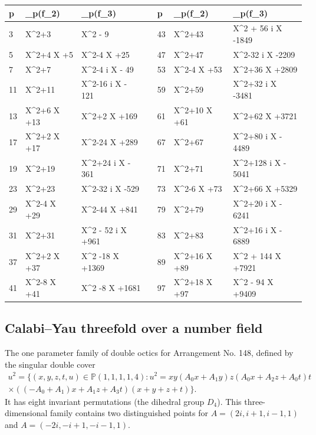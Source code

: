 \documentclass[12pt]{amsart}
\theoremstyle{plain}
\theoremstyle{remark}
\theoremstyle{definition}
\newcommand{\PP}{\mathbb P}
\numberwithin{table}{section}
\begin{document}
\begin{longtable}{L|L|Lp{1.5cm}L|L|L}

	p&\chi_{p}(f_{2})&\chi_{p}(f_{3})&&		p&\chi_{p}(f_{2})&\chi_{p}(f_{3})\\
	& X^{2}+3 & X^{2} - 9 &&
	43& X^{2}+43 & X^{2} + 56 i X -1849 \\
	5& X^{2}+4 X +5 & X^{2}-4 X +25 &&	47& X^{2}+47 & X^{2}-32 i X -2209 \\
	7& X^{2}+7 & X^{2}-4 i X - 49 &&53& X^{2}-4 X +53 & X^{2}+36 X +2809 \\
	11& X^{2}+11 & X^{2}-16 i X - 121 &&59& X^{2}+59 & X^{2}+32 i X -3481 \\
	13& X^{2}+6 X +13 & X^{2}+2 X +169 &&61& X^{2}+10 X +61 & X^{2}+62 X +3721\\
	17& X^{2}+2 X +17 & X^{2}-24 X +289 &&67& X^{2}+67 & X^{2}+80 i X - 4489\\
	19& X^{2}+19 & X^{2}+24 i X - 361 &&71& X^{2}+71 & X^{2}+128 i X - 5041\\
	23& X^{2}+23 & X^{2}-32 i X -529 &&73& X^{2}-6 X +73 & X^{2}+66 X +5329\\
	29& X^{2}-4 X +29 & X^{2}-44 X +841&&79& X^{2}+79 & X^{2}+20 i X - 6241 \\
	31& X^{2}+31 & X^{2} - 52 i X +961 &&83& X^{2}+83 & X^{2}+16 i X - 6889 \\
	37& X^{2}+2 X +37 & X^{2} -18 X +1369 &&89& X^{2}+16 X +89 & X^{2} + 144 X +7921\\
	41& X^{2}-8 X +41 & X^{2} -8 X +1681 &&97& X^{2}+18 X +97 & X^{2} - 94 X +9409 \\
\end{longtable}

\subsection{Calabi--Yau threefold over a number field}
The one parameter family of double octics for Arrangement No. 148, defined by the singular double cover
\begin{multline*}
	u^{2}=\{(x,y,z,t,u)\in\PP(1,1,1,1,4):
	u^{2} = xy(A_{0}x + A_{1}y)z(A_{0}x + A_{2}z + A_{0}t)t\\
	\times((-A_{0} + A_{1})x + A_{1}z + A_{3}t)(x + y + z + t)\}.
\end{multline*}
It has eight invariant permutations (the dihedral group $D_{4}$). This three-dimensional family contains two distinguished points for $A=(2i,i+1,i-1,1)$ and $A=(-2i,-i+1,-i-1,1)$.
\end{document}
